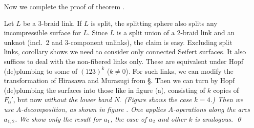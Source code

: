 \begin{appendix}
Now we complete the proof of theorem .

Let $L$ be a 3-braid link. If $L$ is split, the splitting sphere
also splits any incompressible surface for $L$. Since
$L$ is a split union of a 2-braid link and an unknot
(incl.~2 and 3-component unlinks), the claim is easy.
Excluding split links, corollary  shows we
need to consider only connected Seifert surfaces. It also
suffices to deal with the non-fibered links only. These are
equivalent under Hopf (de)plumbing to some of $(123)^k$ ($k\ne
0$). For such links, we can modify the transformation of
Hirasawa and Murasugi from \S{}. Then we can turn
by Hopf (de)plumbing the surfaces into those like in figure
 (a), consisting of $k$ copies of $F_0'$, but
now \em{without} the lower band $N$. (Figure 
shows the case $k=4$.) Then we use $A$-decomposition, as
shown in figure . One applies $A$-operations
along the arcs $a_{1,2}$. We show only the result for $a_1$,
the case of $a_2$ and other $k$ is analogous. \qed

\end{appendix}


